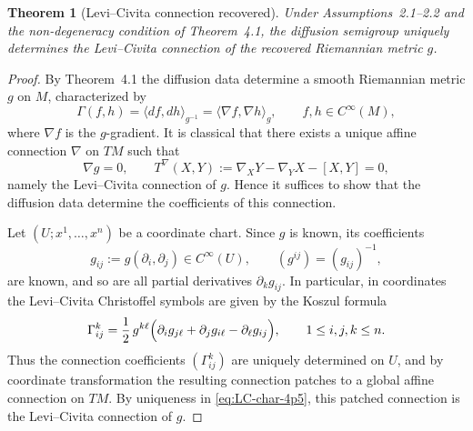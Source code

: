 \documentclass[11pt]{amsart}
\newtheorem{theorem}{Theorem}[section]
\theoremstyle{definition}
\theoremstyle{remark}
\begin{document}
\begin{theorem}[Levi--Civita connection recovered]\label{thm:recover-connection}
Under Assumptions~2.1--2.2 and the non-degeneracy condition of
Theorem~4.1, the diffusion semigroup uniquely determines the
Levi--Civita connection of the recovered Riemannian metric $g$.
\end{theorem}
\begin{proof}
By Theorem~4.1 the diffusion data determine a smooth Riemannian metric $g$ on $M$, characterized by
\begin{equation}\label{eq:Gamma-metric-4p5}
\Gamma(f,h)=\langle df,dh\rangle_{g^{-1}}=\langle \nabla f,\nabla h\rangle_g,
\qquad f,h\in C^\infty(M),
\end{equation}
where $\nabla f$ is the $g$-gradient. It is classical that there exists a unique affine connection
$\nabla$ on $TM$ such that
\begin{equation}\label{eq:LC-char-4p5}
\nabla g =0,
\qquad
T^\nabla(X,Y):=\nabla_XY-\nabla_YX-[X,Y]=0,
\end{equation}
namely the Levi--Civita connection of $g$. Hence it suffices to show that the diffusion data determine
the coefficients of this connection.

Let $(U;x^1,\dots,x^n)$ be a coordinate chart. Since $g$ is known, its coefficients
\[
g_{ij}:=g(\partial_i,\partial_j)\in C^\infty(U),
\qquad
(g^{ij})=(g_{ij})^{-1},
\]
are known, and so are all partial derivatives $\partial_k g_{ij}$.
In particular, in coordinates the Levi--Civita Christoffel symbols are given by the Koszul formula
\begin{equation}\label{eq:Koszul-Christoffel-4p5}
\Gamma^k_{ij}
=\frac12\,g^{k\ell}\Bigl(\partial_i g_{j\ell}+\partial_j g_{i\ell}-\partial_\ell g_{ij}\Bigr),
\qquad 1\le i,j,k\le n.
\end{equation}
Thus the connection coefficients $(\Gamma^k_{ij})$ are uniquely determined on $U$, and by coordinate
transformation the resulting connection patches to a global affine connection on $TM$. By uniqueness
in \eqref{eq:LC-char-4p5}, this patched connection is the Levi--Civita connection of $g$.


\end{proof}
\end{document}
